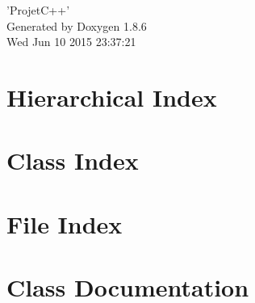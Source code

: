 \documentclass[twoside]{book}
\newcommand{\clearemptydoublepage}{%
  \newpage{\pagestyle{empty}\cleardoublepage}%
}
\begin{document}
\hypersetup{pageanchor=false}
\begin{titlepage}
\vspace*{7cm}
\begin{center}%
{\Large 'Projet\-C++' }\\
\vspace*{1cm}
{\large Generated by Doxygen 1.8.6}\\
\vspace*{0.5cm}
{\small Wed Jun 10 2015 23:37:21}\\
\end{center}
\end{titlepage}
\clearemptydoublepage
\tableofcontents
\clearemptydoublepage
{}
\hypersetup{pageanchor=true}

\chapter{Hierarchical Index}

\chapter{Class Index}

\chapter{File Index}

\chapter{Class Documentation}












































\end{document}

